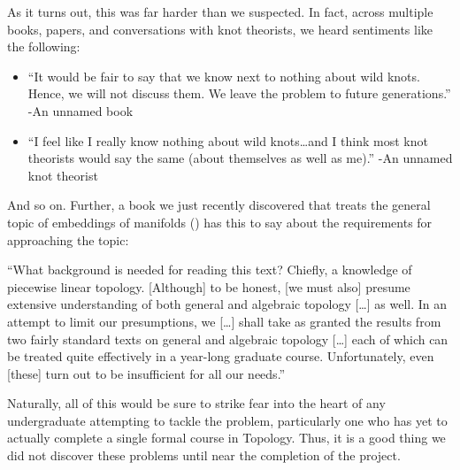 As it turns out, this was far harder than we suspected. In fact,
across multiple books, papers, and conversations with knot theorists,
we heard sentiments like the following:
\begin{itemize}
  \item ``It would be fair to say that we know next to nothing about wild
    knots. Hence, we will not discuss them. We leave the problem to
    future generations.'' -An unnamed book
  \item ``I feel like I really know nothing about wild knots\ldots and
    I think most knot theorists would say the same (about themselves
    as well as me).'' -An unnamed knot theorist
\end{itemize}
And so on. Further, a book we just recently discovered that treats the
general topic of embeddings of manifolds (\cite{Daverman}) has this to
say about the requirements for approaching the topic:
\begin{leftbar}
  ``What background is needed for reading this text? Chiefly, a
  knowledge of piecewise linear topology. [Although] to be honest, [we
  must also] presume extensive understanding of both general and
  algebraic topology [\ldots] as well. In an attempt to limit our
  presumptions, we [\ldots] shall take as granted the results from two
  fairly standard texts on general and algebraic topology [\ldots]
  each of which can be treated quite effectively in a year-long
  graduate course. Unfortunately, even [these] turn out to be
  insufficient for all our needs.''
\end{leftbar}
Naturally, all of this would be sure to strike fear into the heart of
any undergraduate attempting to tackle the problem, particularly one
who has yet to actually complete a single formal course in Topology.
Thus, it is a good thing we did not discover these problems until near
the completion of the project.




